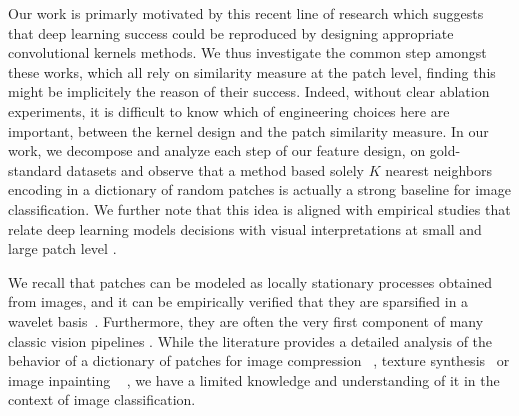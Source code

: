 \documentclass{article}
\newcommand{\mynotes}[1]{\textcolor{red}{#1}}
\begin{document}
Our work is primarly motivated by this recent line of research which suggests that  deep learning success  could be reproduced by designing appropriate convolutional kernels methods.
We thus investigate the common step amongst these works, which all rely on similarity measure at the patch level, finding this might be implicitely the reason of  their success.  Indeed, without clear ablation experiments, it is difficult to know which of engineering choices here are important, between the kernel design and the patch similarity measure. In our work, we decompose and analyze each step of our feature design, on gold-standard  datasets and observe that a method based solely $K$ nearest neighbors encoding in a dictionary of random patches is actually a strong baseline for image classification. We further note that this idea is aligned with empirical studies that relate deep learning models decisions with visual interpretations at small and large patch level
\citep{zeiler2014visualizing,brendel2019approximating}.



  We recall that patches can be modeled as locally stationary processes obtained from images, and it can be empirically verified that they are sparsified in a wavelet basis~\citep{mallat1999wavelet}. Furthermore, they are often the very first component of many classic vision pipelines \citep{perronnin2010improving,lowe2004distinctive,brendel2019approximating,oyallon2018scattering}. While the literature provides a detailed analysis of the behavior of a dictionary of patches for image compression
~\citep{wallace1992jpeg}, texture synthesis~\citep{efros1999texture} or image inpainting ~\citep{criminisi2004region} , we have a limited knowledge and understanding of it in the context of image classification. %
\end{document}

